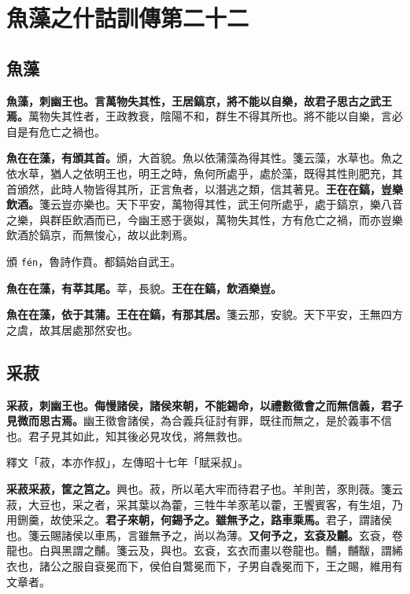 \chapter{魚藻之什詁訓傳第二十二}

\section{魚藻}


\textbf{魚藻，刺幽王也。言萬物失其性，王居鎬京，將不能以自樂，故君子思古之武王焉。}{\footnotesize 萬物失其性者，王政教衰，陰陽不和，群生不得其所也。將不能以自樂，言必自是有危亡之禍也。}

\textbf{魚在在藻，有頒其首。}{\footnotesize 頒，大首貌。魚以依蒲藻為得其性。箋云藻，水草也。魚之依水草，猶人之依明王也，明王之時，魚何所處乎，處於藻，既得其性則肥充，其首頒然，此時人物皆得其所，正言魚者，以潛逃之類，信其著見。}\textbf{王在在鎬，豈樂飲酒。}{\footnotesize 箋云豈亦樂也。天下平安，萬物得其性，武王何所處乎，處于鎬京，樂八音之樂，與群臣飲酒而已，今幽王惑于褒姒，萬物失其性，方有危亡之禍，而亦豈樂飲酒於鎬京，而無悛心，故以此刺焉。}

\begin{quoting}頒 \texttt{fén}，魯詩作賁。都鎬始自武王。\end{quoting}

\textbf{魚在在藻，有莘其尾。}{\footnotesize 莘，長貌。}\textbf{王在在鎬，飲酒樂豈。}

\textbf{魚在在藻，依于其蒲。王在在鎬，有那其居。}{\footnotesize 箋云那，安貌。天下平安，王無四方之虞，故其居處那然安也。}

\section{采菽}


\textbf{采菽，刺幽王也。侮慢諸侯，諸侯來朝，不能錫命，以禮數徵會之而無信義，君子見微而思古焉。}{\footnotesize 幽王徵會諸侯，為合義兵征討有罪，既往而無之，是於義事不信也。君子見其如此，知其後必見攻伐，將無救也。}

\begin{quoting}釋文「菽，本亦作叔」，左傳昭十七年「賦采叔」。\end{quoting}

\textbf{采菽采菽，筐之筥之。}{\footnotesize 興也。菽，所以芼大牢而待君子也。羊則苦，豕則薇。箋云菽，大豆也，采之者，采其葉以為藿，三牲牛羊豕芼以藿，王饗賓客，有生俎，乃用鉶羹，故使采之。}\textbf{君子來朝，何錫予之。雖無予之，路車乘馬。}{\footnotesize 君子，謂諸侯也。箋云賜諸侯以車馬，言雖無予之，尚以為薄。}\textbf{又何予之，玄袞及黼。}{\footnotesize 玄袞，卷龍也。白與黑謂之黼。箋云及，與也。玄袞，玄衣而畫以卷龍也。黼，黼黻，謂絺衣也，諸公之服自袞冕而下，侯伯自鷩冕而下，子男自毳冕而下，王之賜，維用有文章者。}

